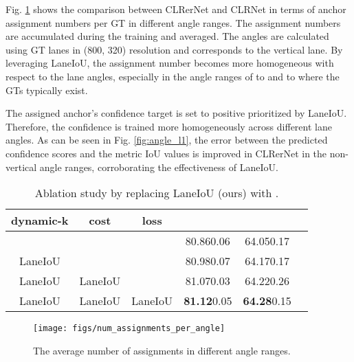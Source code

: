 \documentclass[10pt,twocolumn,letterpaper]{article}
\begin{document}
Fig. \ref{fig:angle_dependency} shows the comparison between CLRerNet and CLRNet in terms of anchor assignment numbers per GT in different angle ranges.
The assignment numbers are accumulated during the training and averaged.
The angles are calculated using GT lanes in (800, 320) resolution and  corresponds to the vertical lane.
By leveraging LaneIoU, the assignment number becomes more homogeneous with respect to the lane angles, especially in the angle ranges of  to  and  to  where the GTs typically exist.

The assigned anchor's confidence target is set to positive prioritized by LaneIoU.
Therefore, the confidence is trained more homogeneously across different lane angles.
As can be seen in Fig. \ref{fig:angle_l1}, the  error between the predicted confidence scores and the metric IoU values is improved in CLRerNet in the non-vertical angle ranges, corroborating the effectiveness of LaneIoU.


\begin{table}
\begin{center}
\begin{adjustbox}{width=\linewidth} 
\begin{tabular}{cccccc}
\hline
dynamic-k & cost  & loss &  &    \\
\hline
\cite{Zheng_2022_CVPR}  & \cite{Zheng_2022_CVPR}  &  \cite{Zheng_2022_CVPR}  & 80.86\footnotesize{0.06} &64.05\footnotesize{0.17} \\
LaneIoU & \cite{Zheng_2022_CVPR} & \cite{Zheng_2022_CVPR}  & 80.98\footnotesize{0.07} &64.17\footnotesize{0.17}  \\
LaneIoU & LaneIoU & \cite{Zheng_2022_CVPR}  & 81.07\footnotesize{0.03} &64.22\footnotesize{0.26}  \\
LaneIoU & LaneIoU  & LaneIoU & \textbf{81.12}\footnotesize{0.05} & \textbf{64.28}\footnotesize{0.15}  \\
\hline
\end{tabular}
\end{adjustbox}
\end{center}
\caption{Ablation study by replacing LaneIoU (ours) with \cite{Zheng_2022_CVPR}.}
\label{table:ablation}
\end{table}

\begin{figure}[t]
\begin{center}
 \texttt{[image: figs/num\_assignments\_per\_angle]}
\end{center}
   \caption{The average number of assignments in different angle ranges.}
\label{fig:angle_dependency}
\end{figure}
\end{document}
